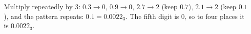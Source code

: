 Multiply repeatedly by $3$: $0.3\to0$, $0.9\to0$, $2.7\to2$ (keep $0.7$), $2.1\to2$ (keep $0.1$), and the pattern repeats: $0.1=0.\overline{0022}_3$. The fifth digit is $0$, so to four places it is $\boxed{0.0022_3}$.

